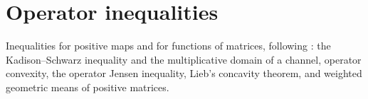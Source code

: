 \part{Operator inequalities}
\label{part:operator_inequalities}

Inequalities for positive maps and for functions of matrices, following
\cite[Chapter~5]{Wolf2012Quantum}: the Kadison--Schwarz inequality and the
multiplicative domain of a channel, operator convexity, the operator Jensen
inequality, Lieb's concavity theorem, and weighted geometric means of positive
matrices.
